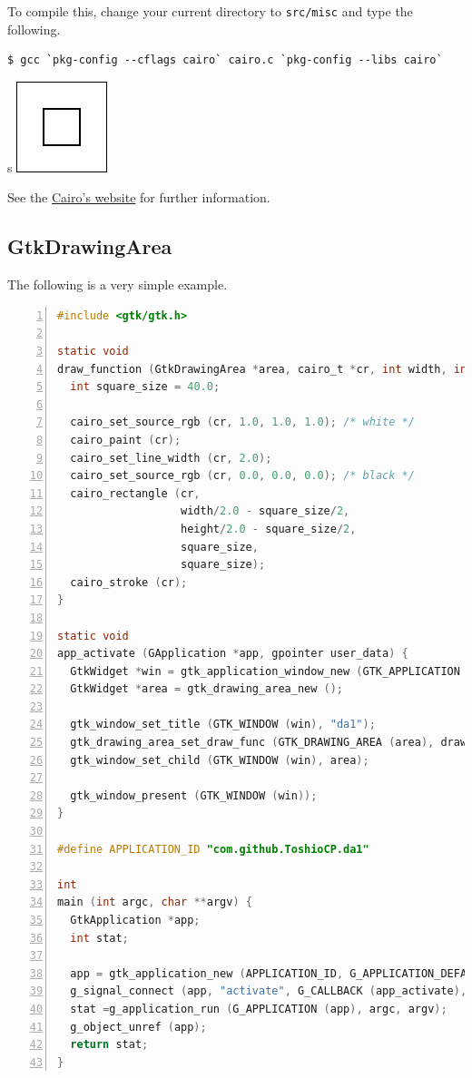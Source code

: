 To compile this, change your current directory to
\passthrough{\lstinline!src/misc!} and type the following.

\begin{lstlisting}
$ gcc `pkg-config --cflags cairo` cairo.c `pkg-config --libs cairo`
\end{lstlisting}

s \includegraphics{../image/rectangle.png}

See the \href{https://www.cairographics.org/}{Cairo's website} for
further information.

\subsection{GtkDrawingArea}\label{gtkdrawingarea}

The following is a very simple example.

\begin{lstlisting}[language=C, numbers=left]
#include <gtk/gtk.h>

static void
draw_function (GtkDrawingArea *area, cairo_t *cr, int width, int height, gpointer user_data) {
  int square_size = 40.0;

  cairo_set_source_rgb (cr, 1.0, 1.0, 1.0); /* white */
  cairo_paint (cr);
  cairo_set_line_width (cr, 2.0);
  cairo_set_source_rgb (cr, 0.0, 0.0, 0.0); /* black */
  cairo_rectangle (cr,
                   width/2.0 - square_size/2,
                   height/2.0 - square_size/2,
                   square_size,
                   square_size);
  cairo_stroke (cr);
}

static void
app_activate (GApplication *app, gpointer user_data) {
  GtkWidget *win = gtk_application_window_new (GTK_APPLICATION (app));
  GtkWidget *area = gtk_drawing_area_new ();

  gtk_window_set_title (GTK_WINDOW (win), "da1");
  gtk_drawing_area_set_draw_func (GTK_DRAWING_AREA (area), draw_function, NULL, NULL);
  gtk_window_set_child (GTK_WINDOW (win), area);

  gtk_window_present (GTK_WINDOW (win));
}

#define APPLICATION_ID "com.github.ToshioCP.da1"

int
main (int argc, char **argv) {
  GtkApplication *app;
  int stat;

  app = gtk_application_new (APPLICATION_ID, G_APPLICATION_DEFAULT_FLAGS);
  g_signal_connect (app, "activate", G_CALLBACK (app_activate), NULL);
  stat =g_application_run (G_APPLICATION (app), argc, argv);
  g_object_unref (app);
  return stat;
}
\end{lstlisting}

